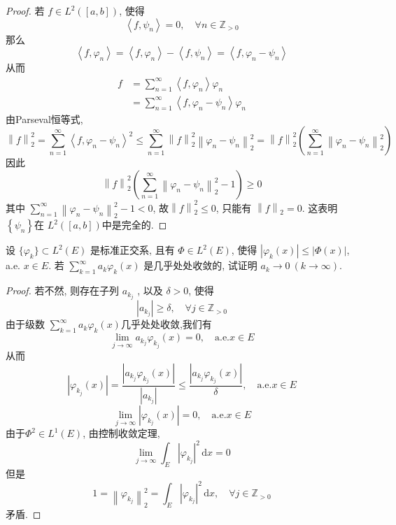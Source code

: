 \documentclass[../main.tex]{subfiles}
\begin{document}
\begin{proof}
 若 \(  f\in L^{2}\left( \left[ a,b \right]  \right)   \), 使得 \[
 \left<f, \psi _{n} \right>= 0,\quad \forall n\in \mathbb{Z} _{> 0}
 \] 那么 \[
 \left<f, \varphi _{n} \right>= \left<f, \varphi _{n} \right>-\left<f,\psi _{n} \right>= \left<f, \varphi _{n}-\psi _{n} \right>
 \]从而 \[
 \begin{aligned}
 f &= \sum _{n = 1}^{\infty}\left<f, \varphi _{n} \right> \varphi _{n} \\ 
   &= \sum _{n = 1}^{\infty}\left<f,  \varphi _{n}-\psi _{n} \right> \varphi _{n}
 \end{aligned}
 \]由Parseval恒等式,  \[
 \left\| f \right\|_{2}^{2}= \sum _{n = 1}^{\infty}\left<f, \varphi _{n}-\psi _{n} \right>^{2}\le \sum _{n = 1}^{\infty}\left\| f \right\|_{2}^{2}\left\|  \varphi _{n}-\psi _{n} \right\|_{2}^{2}= \left\| f \right\|_{2}^{2}\left( \sum _{n = 1}^{\infty}\left\|  \varphi _{n}-\psi _{n} \right\|_{2}^{2} \right) 
 \]因此 \[
 \left\| f \right\|_{2}^{2}\left( \sum _{n = 1}^{\infty}\left\|  \varphi _{n}-\psi _{n} \right\|_{2}^{2}-1 \right)\ge 0 
 \]其中 \(  \sum _{n = 1}^{\infty}\left\|  \varphi _{n}-\psi _{n} \right\|_{2}^{2}-1 <  0  \), 故\(  \left\| f \right\|_{2}^{2}\le 0  \), 只能有 \(  \left\| f \right\|_{2}= 0  \).   这表明 \(  \left\{ \psi _{n} \right\}  \)在 \(  L^{2}\left( \left[ a,b \right]  \right)   \)中是完全的.  
\end{proof}

\begin{exercise}{}{}
设 $\{\varphi_k\} \subset L^2(E)$ 是标准正交系, 且有 $\Phi \in L^2(E)$, 使得 $|\varphi_k(x)| \leqslant |\Phi(x)|$, a.e. $x \in E$. 若 $\sum_{k=1}^\infty a_k \varphi_k(x)$ 是几乎处处收敛的, 试证明 $a_k \to 0 \ (k \to \infty)$.
\end{exercise}
\begin{proof}
  若不然, 则存在子列 \(  a_{k_{j}}  \) , 以及 \(   \delta > 0  \), 使得 \[
  \left| a_{k_{j}} \right| \ge  \delta ,\quad \forall j\in \mathbb{Z} _{> 0}
  \] 由于级数 \(  \sum _{k= 1}^{\infty}a_{k} \varphi _{k}\left( x \right)   \)几乎处处收敛,我们有 \[
  \lim_{j\to \infty}a_{k_{j}} \varphi _{k_{j}}\left( x \right) = 0,\quad \text{a.e.} x\in E
  \]从而 \[
  \left|  \varphi _{k_{j}}\left( x \right)  \right|= \frac{\left| a_{k_{j}} \varphi _{k_{j}}\left( x \right)  \right|  }{ \left| a_{k_{j}} \right| }\le \frac{\left| a_{k_{j}} \varphi _{k_{j}}\left( x \right)  \right|  }{ \delta  }   ,\quad \text{a.e.} x\in E
  \] \[
  \lim _{j\to \infty}\left|  \varphi _{k_{j}}\left( x \right)  \right| = 0,\quad \text{a.e.}x\in E
  \]由于\(  \Phi ^{2}\in L^{1}\left( E \right)   \), 由控制收敛定理,  \[
\lim_{j\to \infty}\int_{E}\left|  \varphi _{k_{j}} \right|^{2}\,\mathrm{d} x = 0
  \]但是 \[
  1= \left\|  \varphi _{k_{j}} \right\|_{2}^{2}= \int_{E}\left|  \varphi _{k_{j}} \right|^{2}\,\mathrm{d} x ,\quad \forall j\in \mathbb{Z} _{> 0}
  \]矛盾.
\end{proof}
\end{document}
